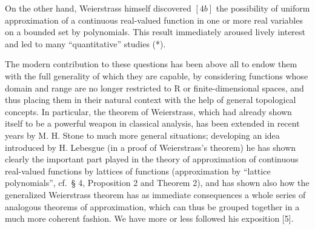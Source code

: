 On the other hand, Weierstrass himself discovered \([4b]\) the possibility of uniform approximation of a continuous real-valued function in one or more real variables on a bounded set by polynomials. This result immediately aroused lively interest and led to many ``quantitative'' studies (*).

The modern contribution to these questions has been above all to endow them with the full generality of which they are capable, by considering functions whose domain and range are no longer restricted to R or finite-dimensional spaces, and thus placing them in their natural context with the help of general topological concepts. In particular, the theorem of Weierstrass, which had already shown itself to be a powerful weapon in classical analysis, has been extended in recent years by M. H. Stone to much more general situations; developing an idea introduced by H. Lebesgue (in a proof of Weierstrass's theorem) he has shown clearly the important part played in the theory of approximation of continuous real-valued functions by lattices of functions (approximation by ``lattice polynomials'', cf.~§ 4, Proposition 2 and Theorem 2), and has shown also how the generalized Weierstrass theorem has as immediate consequences a whole series of analogous theorems of approximation, which can thus be grouped together in a much more coherent fashion. We have more or less followed his exposition {[}5{]}.

